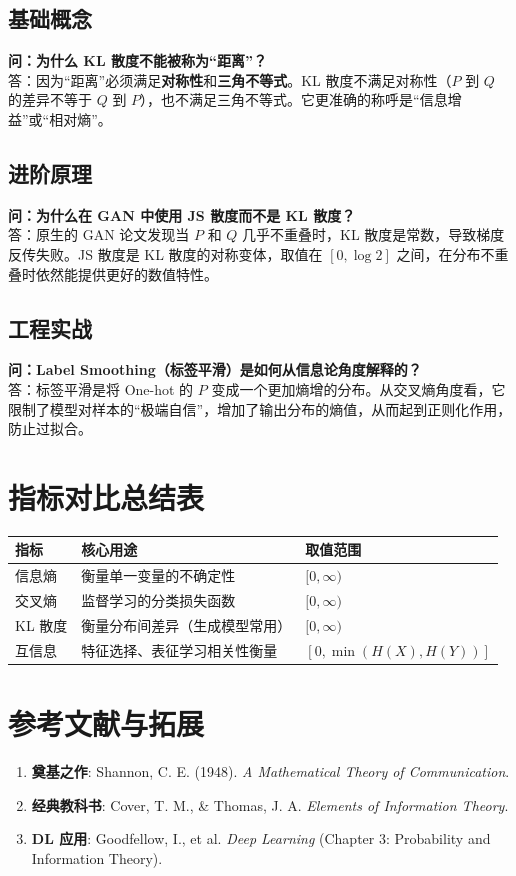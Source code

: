 \documentclass[12pt, a4paper]{article}
\begin{document}
\subsection{基础概念}
\textbf{问：为什么 KL 散度不能被称为“距离”？}\\
答：因为“距离”必须满足\textbf{对称性}和\textbf{三角不等式}。KL 散度不满足对称性（$P$ 到 $Q$ 的差异不等于 $Q$ 到 $P$），也不满足三角不等式。它更准确的称呼是“信息增益”或“相对熵”。

\subsection{进阶原理}
\textbf{问：为什么在 GAN 中使用 JS 散度而不是 KL 散度？}\\
答：原生的 GAN 论文发现当 $P$ 和 $Q$ 几乎不重叠时，KL 散度是常数，导致梯度反传失败。JS 散度是 KL 散度的对称变体，取值在 $[0, \log 2]$ 之间，在分布不重叠时依然能提供更好的数值特性。

\subsection{工程实战}
\textbf{问：Label Smoothing（标签平滑）是如何从信息论角度解释的？}\\
答：标签平滑是将 One-hot 的 $P$ 变成一个更加熵增的分布。从交叉熵角度看，它限制了模型对样本的“极端自信”，增加了输出分布的熵值，从而起到正则化作用，防止过拟合。

\section{指标对比总结表}

\begin{table}[h]
\centering
\begin{tabularx}{\textwidth}{|l|X|l|}
\hline
\textbf{指标} & \textbf{核心用途} & \textbf{取值范围} \\
\hline
信息熵 & 衡量单一变量的不确定性 & $[0, \infty)$ \\
\hline
交叉熵 & 监督学习的分类损失函数 & $[0, \infty)$ \\
\hline
KL 散度 & 衡量分布间差异（生成模型常用） & $[0, \infty)$ \\
\hline
互信息 & 特征选择、表征学习相关性衡量 & $[0, \min(H(X),H(Y))]$ \\
\hline
\end{tabularx}
\end{table}

\section{参考文献与拓展}
\begin{enumerate}
    \item \textbf{奠基之作}: Shannon, C. E. (1948). \textit{A Mathematical Theory of Communication}.
    \item \textbf{经典教科书}: Cover, T. M., & Thomas, J. A. \textit{Elements of Information Theory}.
    \item \textbf{DL 应用}: Goodfellow, I., et al. \textit{Deep Learning} (Chapter 3: Probability and Information Theory).
\end{enumerate}
\end{document}
